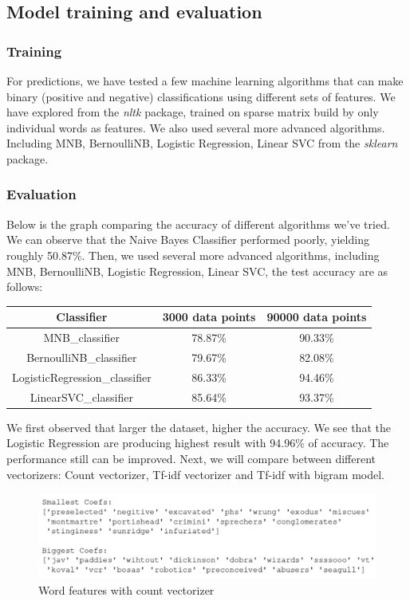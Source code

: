 \documentclass{article}
\begin{document}
\subsection{Model training and evaluation}
\subsubsection{Training}
For predictions, we have tested a few machine learning algorithms that can make binary (positive and negative) classifications using different sets of features. We have explored from the \textit{nltk} package, trained on sparse matrix build by only individual words as features. We also used several more advanced algorithms. Including MNB, BernoulliNB, Logistic Regression, Linear SVC from the \textit{sklearn} package.

\subsubsection{Evaluation}
Below is the graph comparing the accuracy of different algorithms we've tried.  
We can observe that the Naive Bayes Classifier performed poorly, yielding roughly 50.87\%. 
Then, we used several more advanced algorithms, including MNB, BernoulliNB, Logistic Regression, Linear SVC, the test accuracy are as follows: 

\begin{table}[!ht]
\begin{center}
\begin{tabular}{ |c|c|c|} 
 \hline
Classifier & 3000 data points & 90000 data points\\ 
  \hline
 MNB\_classifier & 78.87\% & 90.33\% \\ 
  \hline
BernoulliNB\_classifier & 79.67\%& 82.08\%\\
  \hline
LogisticRegression\_classifier & 86.33\% & 94.46\%\\
  \hline
LinearSVC\_classifier & 85.64\%& 93.37\% \\
  \hline
\end{tabular}
\end{center}
\end{table}

We first observed that larger the dataset, higher the accuracy. We see that the Logistic Regression are producing highest result with 94.96\% of accuracy.  The performance still can be improved. Next, we will compare between different vectorizers: Count vectorizer, Tf-idf vectorizer and Tf-idf with bigram model. 
\begin{figure}[!ht]
\centering
\includegraphics[width=\textwidth]{cowords.png}
\caption{Word features with count vectorizer}
\end{figure}
\end{document}
